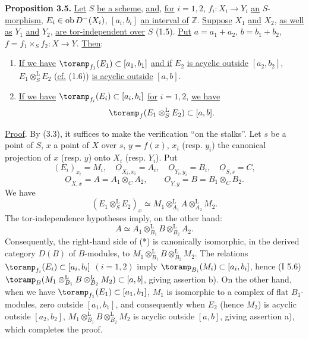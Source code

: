 \textbf{Proposition 3.5.} \uline{Let} \(S\) \uline{be a scheme}, \uline{and}, \uline{for} \(i=1,2\), \(f_i:X_i\longrightarrow Y_i\) \uline{an} \(S\)-\uline{morphism}, \(E_i\in\operatorname{ob} D^{-}(X_i)\), \([a_i,b_i]\) \uline{an interval of} \(\mathbb Z\). \uline{Suppose} \(X_1\) \uline{and} \(X_2\), \uline{as well as} \(Y_1\) \uline{and} \(Y_2\), \uline{are tor-independent over} \(S\) (1.5). \uline{Put} \(a=a_1+a_2\), \(b=b_1+b_2\), \(f=f_1\times_Sf_2:X\to Y\). \uline{Then}:
\begin{enumerate}[label=\alph*)]
\item \uline{If we have} \(\toramp_{f_1}(E_1)\subset[a_1,b_1]\) \uline{and if} \(E_2\) \uline{is acyclic outside} \([a_2,b_2]\), \(E_1\otimes_S^{\mathrm L}E_2\) (\uline{cf.} (1.6)) \uline{is acyclic outside} \([a,b]\).
\item \uline{If we have} \(\toramp_{f_i}(E_i)\subset[a_i,b_i]\) \uline{for} \(i=1,2\), \uline{we have}
\[
  \toramp_f(E_1\otimes_S^{\mathrm L}E_2)\subset[a,b].
\]
\end{enumerate}

\uline{Proof}. By (3.3), it suffices to make the verification ``on the stalks''. Let \(s\) be a point of \(S\), \(x\) a point of \(X\) over \(s\), \(y=f(x)\), \(x_i\) (resp. \(y_i\)) the canonical projection of \(x\) (resp. \(y\)) onto \(X_i\) (resp. \(Y_i\)). Put
\[
  (E_i)_{x_i}=M_i,\quad \underline{O}_{X_i,x_i}=A_i,\quad
  \underline{O}_{Y_i,y_i}=B_i,\quad \underline{O}_{S,s}=C,
\]
\[
  \underline{O}_{X,x}=A=A_1\otimes_C A_2,\qquad
  \underline{O}_{Y,y}=B=B_1\otimes_C B_2.
\]
We have
\begin{equation}\tag{$*$}
  (E_1\otimes_S^{\mathrm L}E_2)_x
  \simeq
  M_1\otimes_{A_1}^{\mathrm L}A\otimes_{A_2}^{\mathrm L}M_2.
\end{equation}
The tor-independence hypotheses imply, on the other hand:
\[
  A\simeq A_1\otimes_{B_1}^{\mathrm L}B\otimes_{B_2}^{\mathrm L}A_2.
\]
Consequently, the right-hand side of (*) is canonically isomorphic, in the
%
derived category \(D(B)\) of \(B\)-modules, to \(M_1\otimes_{B_1}^{\mathrm L}B\otimes_{B_2}^{\mathrm L}M_2\). The relations \(\toramp_{f_i}(E_i)\subset[a_i,b_i]\) \((i=1,2)\) imply \(\toramp_{B_i}(M_i)\subset[a_i,b_i]\), hence (I 5.6) \(\toramp_B(M_1\otimes_{B_1}^{\mathrm L}B\otimes_{B_2}^{\mathrm L}M_2)\subset[a,b]\), giving assertion b). On the other hand, when we have \(\toramp_{f_1}(E_1)\subset[a_1,b_1]\), \(M_1\) is isomorphic to a complex of flat \(B_1\)-modules, zero outside \([a_1,b_1]\), and consequently when \(E_2\) (hence \(M_2\)) is acyclic outside \([a_2,b_2]\), \(M_1\otimes_{B_1}^{\mathrm L}B\otimes_{B_2}^{\mathrm L}M_2\) is acyclic outside \([a,b]\), giving assertion a), which completes the proof.


